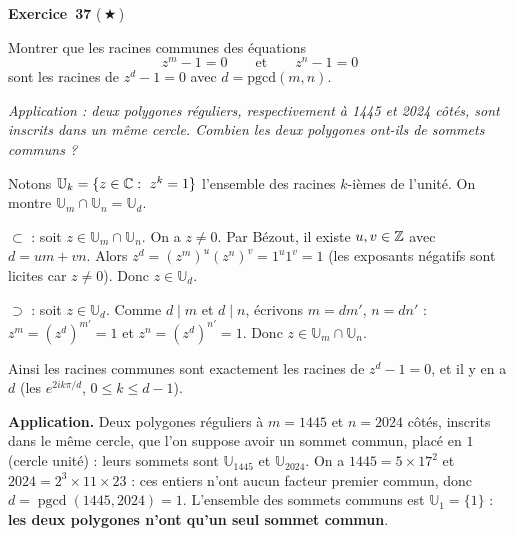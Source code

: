 \documentclass[11pt,a4paper]{article}
\newcommand{\pgcd}{\operatorname{pgcd}}
\newcommand{\U}{\mathbb{U}}
\begin{document}
	\medskip\noindent\textbf{\Large\color{bleu}Exercice~37} \textnormal{(\,$\bigstar$\,)}\nopagebreak
	\begin{enonce}
		Montrer que les racines communes des équations
		\[
		z^m - 1 = 0 \qquad \text{et} \qquad z^n - 1 = 0
		\]
		sont les racines de $z^d - 1 = 0$ avec $d = \text{pgcd}(m,n)$.
		
		\textit{Application : deux polygones réguliers, respectivement à 1445 et 2024 côtés, sont inscrits dans un même cercle. Combien les deux polygones ont-ils de sommets communs ?}
	\end{enonce}
	\begin{corrige}
		Notons $\U_k=\{z\in\C:\ z^k=1\}$ l'ensemble des racines $k$-ièmes de l'unité. On montre $\U_m\cap\U_n=\U_d$.
		
		\textbf{$\subset$} : soit $z\in\U_m\cap\U_n$. On a $z\neq0$. Par Bézout, il existe $u,v\in\mathbb{Z}$ avec $d=um+vn$. Alors $z^d=(z^m)^u(z^n)^v=1^u1^v=1$ (les exposants négatifs sont licites car $z\neq0$). Donc $z\in\U_d$.
		
		\textbf{$\supset$} : soit $z\in\U_d$. Comme $d\mid m$ et $d\mid n$, écrivons $m=dm'$, $n=dn'$ : $z^m=(z^d)^{m'}=1$ et $z^n=(z^d)^{n'}=1$. Donc $z\in\U_m\cap\U_n$.
		
		Ainsi les racines communes sont exactement les racines de $z^d-1=0$, et il y en a $d$ (les $e^{2ik\pi/d}$, $0\leq k\leq d-1$).
		
		\textbf{Application.} Deux polygones réguliers à $m=1445$ et $n=2024$ côtés, inscrits dans le même cercle, que l'on suppose avoir un sommet commun, placé en $1$ (cercle unité) : leurs sommets sont $\U_{1445}$ et $\U_{2024}$. On a $1445=5\times17^2$ et $2024=2^3\times11\times23$ : ces entiers n'ont aucun facteur premier commun, donc $d=\pgcd(1445,2024)=1$. L'ensemble des sommets communs est $\U_1=\{1\}$ : \textbf{les deux polygones n'ont qu'un seul sommet commun}.
	\end{corrige}
	
\end{document}
